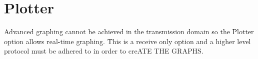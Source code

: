 \section{Plotter}


Advanced graphing cannot be achieved in the transmission domain so the \ds Plotter option allows real-time graphing.
This is a receive only option and a higher level protocol must be adhered to in order to creATE THE GRAPHS.  
